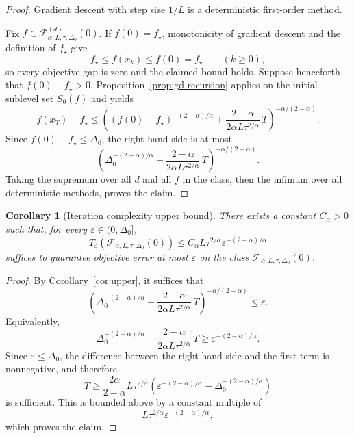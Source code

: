 \documentclass[11pt]{article}
\newtheorem{corollary}[theorem]{Corollary}
\newtheorem{remark}[theorem]{Remark}
\begin{document}
\begin{proof}
Gradient descent with step size $1/L$ is a deterministic first-order method.

Fix $f\in\mathcal F^{(d)}_{\alpha,L,\tau,\Delta_0}(0)$. If $f(0)=f_\star$, monotonicity of gradient descent and the
definition of $f_\star$ give
\[
f_\star\le f(x_k)\le f(0)=f_\star
\qquad (k\ge0),
\]
so every objective gap is zero and the claimed bound holds. Suppose henceforth that $f(0)-f_\star>0$.
Proposition~\ref{prop:gd-recursion} applies on the initial sublevel set $S_0(f)$ and yields
\[
f(x_T)-f_\star
\le
\left(
(f(0)-f_\star)^{-(2-\alpha)/\alpha}
+
\frac{2-\alpha}{2\alpha L\tau^{2/\alpha}}\,T
\right)^{-\alpha/(2-\alpha)}.
\]
Since $f(0)-f_\star\le \Delta_0$, the right-hand side is at most
\[
\left(
\Delta_0^{-(2-\alpha)/\alpha}
+
\frac{2-\alpha}{2\alpha L\tau^{2/\alpha}}\,T
\right)^{-\alpha/(2-\alpha)}.
\]
Taking the supremum over all $d$ and all $f$ in the class, then the infimum over all deterministic methods, proves the claim.
\end{proof}

\begin{corollary}[Iteration complexity upper bound]
\label{cor:upper-complexity}
There exists a constant $C_\alpha>0$ such that, for every $\varepsilon\in(0,\Delta_0]$,
\[
T_\varepsilon\!\left(\mathcal F_{\alpha,L,\tau,\Delta_0}(0)\right)
\le
C_\alpha L\tau^{2/\alpha}\varepsilon^{-(2-\alpha)/\alpha}
\]
suffices to guarantee objective error at most $\varepsilon$ on the class $\mathcal F_{\alpha,L,\tau,\Delta_0}(0)$.
\end{corollary}

\begin{proof}
By Corollary~\ref{cor:upper}, it suffices that
\[
\left(
\Delta_0^{-(2-\alpha)/\alpha}
+
\frac{2-\alpha}{2\alpha L\tau^{2/\alpha}}\,T
\right)^{-\alpha/(2-\alpha)}
\le
\varepsilon.
\]
Equivalently,
\[
\Delta_0^{-(2-\alpha)/\alpha}
+
\frac{2-\alpha}{2\alpha L\tau^{2/\alpha}}\,T
\ge
\varepsilon^{-(2-\alpha)/\alpha}.
\]
Since $\varepsilon\le \Delta_0$, the difference between the right-hand side and the first term is nonnegative, and therefore
\[
T
\ge
\frac{2\alpha}{2-\alpha}
L\tau^{2/\alpha}
\left(
\varepsilon^{-(2-\alpha)/\alpha}-\Delta_0^{-(2-\alpha)/\alpha}
\right)
\]
is sufficient. This is bounded above by a constant multiple of
\[
L\tau^{2/\alpha}\varepsilon^{-(2-\alpha)/\alpha},
\]
which proves the claim.
\end{proof}

\end{document}
